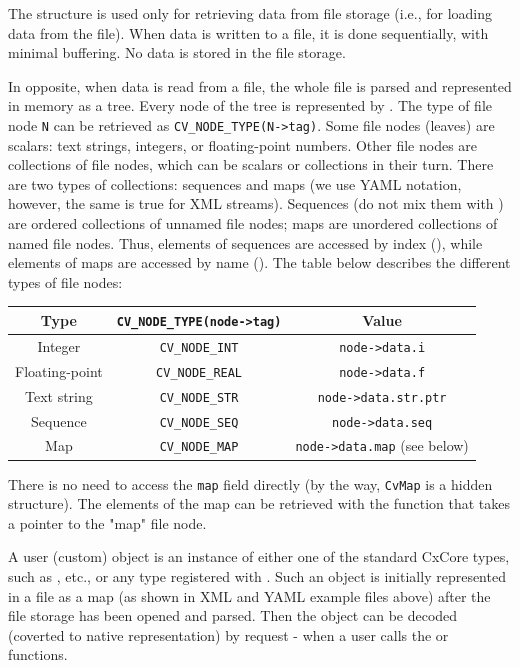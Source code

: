 The structure is used only for retrieving data from file storage
(i.e., for loading data from the file). When data is written to a file,
it is done sequentially, with minimal buffering. No data is stored
in the file storage.

In opposite, when data is read from a file, the whole file is parsed
and represented in memory as a tree. Every node of the tree is
represented by . The type of file node \texttt{N}
can be retrieved as \texttt{CV\_NODE\_TYPE(N->tag)}. Some file nodes
(leaves) are scalars: text strings, integers, or floating-point
numbers. Other file nodes are collections of file nodes, which can
be scalars or collections in their turn. There are two types of
collections: sequences and maps (we use YAML notation, however, the
same is true for XML streams). Sequences (do not mix them with
) are ordered collections of unnamed file nodes; maps
are unordered collections of named file nodes. Thus, elements of
sequences are accessed by index (), while elements
of maps are accessed by name (). The table
below describes the different types of file nodes:

\begin{tabular}{| c | c | c |}
\hline
Type           & \texttt{CV\_NODE\_TYPE(node->tag)} & Value\\ \hline \hline
Integer        & \texttt{CV\_NODE\_INT}             & \texttt{node->data.i} \\ \hline
Floating-point & \texttt{CV\_NODE\_REAL}            & \texttt{node->data.f} \\ \hline
Text string    & \texttt{CV\_NODE\_STR}             & \texttt{node->data.str.ptr} \\ \hline
Sequence       & \texttt{CV\_NODE\_SEQ}             & \texttt{node->data.seq} \\ \hline
Map            & \texttt{CV\_NODE\_MAP}             & \texttt{node->data.map} (see below)\\ \hline
\end{tabular}

There is no need to access the \texttt{map} field directly (by the way,
\texttt{CvMap} is a hidden structure). The elements of the map can
be retrieved with the  function that takes a
pointer to the "map" file node.

A user (custom) object is an instance of either one of the standard CxCore
types, such as ,  etc., or any type
registered with . Such an object is initially
represented in a file as a map (as shown in XML and YAML example files
above) after the file storage has been opened and parsed. Then the
object can be decoded (coverted to native representation) by
request - when a user calls the  or  functions.


